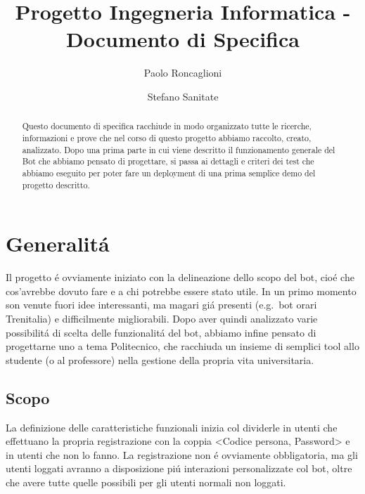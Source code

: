 \documentclass[]{article}
\begin{document}
\author{Paolo Roncaglioni \and Stefano Sanitate}
\title{Progetto Ingegneria Informatica - Documento di Specifica}
\maketitle
\newpage

\begin{abstract}
Questo documento di specifica racchiude in modo organizzato tutte le ricerche, informazioni e prove che nel corso di questo progetto abbiamo raccolto, creato, analizzato. Dopo una prima parte in cui viene descritto il funzionamento generale del Bot che abbiamo pensato di progettare, si passa ai dettagli e criteri dei test che abbiamo eseguito per poter fare un deployment di una prima semplice demo del progetto descritto.
\end{abstract}

\tableofcontents	%
\newpage

\section{Generalitá}
Il progetto é ovviamente iniziato con la delineazione dello scopo del bot, cioé che cos'avrebbe dovuto fare e a chi potrebbe essere stato utile. In un primo momento son venute fuori idee interessanti, ma magari giá presenti (e.g.\ bot orari Trenitalia) e difficilmente migliorabili.
Dopo aver quindi analizzato varie possibilitá di scelta delle funzionalitá del bot, abbiamo infine pensato di progettarne uno a tema Politecnico, che racchiuda un insieme di semplici tool allo studente (o al professore) nella gestione della propria vita universitaria. 

\subsection{Scopo}
La definizione delle caratteristiche funzionali inizia col dividerle in utenti che effettuano la propria registrazione con la coppia <Codice persona, Password> e in utenti che non lo fanno. La registrazione non é ovviamente obbligatoria, ma gli utenti loggati avranno a disposizione piú interazioni personalizzate col bot, oltre che avere tutte quelle possibili per gli utenti normali non loggati.
\end{document}
